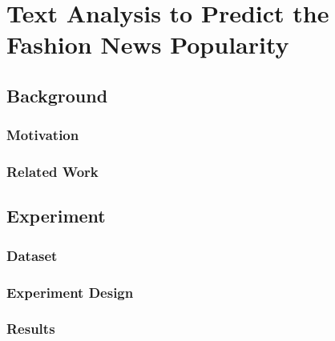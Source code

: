 \chapter{Text Analysis to Predict the Fashion News Popularity}
\label{exp2}
\section{Background}
\subsection{Motivation}
\subsection{Related Work}
\section{Experiment}
\subsection{Dataset}
\subsection{Experiment Design}
\subsection{Results}

